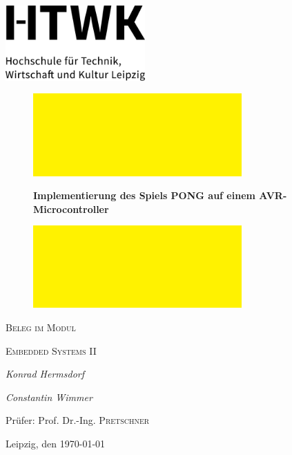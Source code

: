 
\begin{titlepage}
	\centering
	
	\includegraphics[width=0.4\textwidth]{Bilder/LOGO}\par
	\vspace{1cm}

\begin{figure}[H]
\hspace{0.3cm}
\begin{minipage}{0.2\linewidth}
\includegraphics[width=8cm,angle=90]{Bilder/GELB}%
\end{minipage}
\begin{minipage}{0.5\linewidth}
	{\huge\bfseries\centering Implementierung des Spiels PONG auf einem AVR-Microcontroller\par}
\end{minipage}
\begin{minipage}{0.2\linewidth}
\includegraphics[width=8cm,angle=90]{Bilder/GELB}%
\end{minipage}
\end{figure}

		{\scshape\Large Beleg im Modul\par}
	{\scshape\LARGE Embedded Systems II \par}
		\vspace{2cm}
	{\Large\itshape Konrad Hermsdorf \par}
	{\Large\itshape Constantin Wimmer \par}
	\vfill
	Prüfer: Prof. Dr.-Ing. \textsc{Pretschner}\par
	\vfill

	{\large Leipzig, den \today\par}


\end{titlepage}
